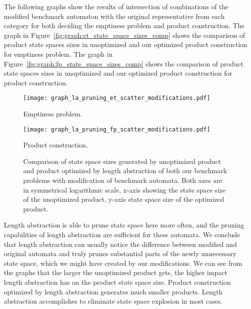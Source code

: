 The following graphs show the results of intersection of combinations of the modified benchmark automaton with the original representative from each category for both deciding the emptiness problem and product construction. The graph in Figure~\ref{fig:graph:et_state_space_sizes_comp} shows the comparison of product state spaces sizes in unoptimized and our optimized product construction for emptiness problem. The graph in Figure~\ref{fig:graph:fp_state_space_sizes_comp} shows the comparison of product state spaces sizes in unoptimized and our optimized product construction for product construction.

\begin{figure*}[ht]
    \centering
    \begin{minipage}{0.49\linewidth}
        \centering
        \texttt{[image: graph\_la\_pruning\_et\_scatter\_modifications.pdf]}
        \caption{Emptiness problem.}
        \label{fig:graph:et_state_space_sizes_comp}
    \end{minipage}
    \hfill
    \begin{minipage}{0.49\linewidth}
        \centering
        \texttt{[image: graph\_la\_pruning\_fp\_scatter\_modifications.pdf]}
        \caption{Product construction.}
        \label{fig:graph:fp_state_space_sizes_comp}
    \end{minipage}
    \vspace{0.5cm}
    \caption{Comparison of state space sizes generated by unoptimized product and product optimized by length abstraction of both our benchmark problems with modification of benchmark automata. Both axes are in symmetrical logarithmic scale, x-axis showing the state space size of the unoptimized product, y-axis state space size of the optimized product.}
    \label{fig:graph:product_state_space_sizes}
\end{figure*}

Length abstraction is able to prune state space here more often, and the pruning capabilities of length abstraction are sufficient for these automata. We conclude that length abstraction can usually notice the difference between modified and original automata and truly prunes substantial parts of the newly unnecessary state space, which we might have created by our modifications. We can see from the graphs that the larger the unoptimized product gets, the higher impact length abstraction has on the product state space size. Product construction optimized by length abstraction generates much smaller products. Length abstraction accomplishes to eliminate state space explosion in most cases.

